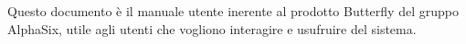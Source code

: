 Questo documento è il manuale utente inerente al prodotto Butterfly del gruppo AlphaSix, utile agli utenti che vogliono interagire
e usufruire del sistema.

